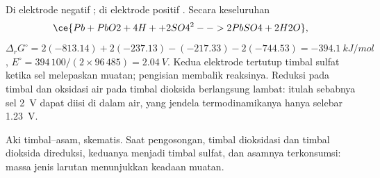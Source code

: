 \begin{example}\label{ex:b2:batteries-electrolysis:lead}
Di elektrode negatif ; di elektrode positif
. Secara keseluruhan
\[
  \ce{Pb + PbO2 + 4H+ + 2SO4^2- -> 2PbSO4 + 2H2O},
\]
$\Delta_r G^\circ = 2(-813.14) + 2(-237.13) - (-217.33) - 2(-744.53) =
\qty{-394.1}{kJ/mol}$, $E^\circ = 394\,100/(2 \times 96\,485) = \qty{2.04}{V}$.
Kedua elektrode tertutup timbal sulfat ketika sel melepaskan muatan;
pengisian membalik reaksinya. Reduksi  pada timbal dan oksidasi air
pada timbal dioksida berlangsung lambat: itulah sebabnya sel \qty{2}{V}
dapat diisi di dalam air, yang jendela termodinamikanya hanya selebar
\qty{1.23}{V}.
\end{example}

\begin{omfigure}

{\small Aki timbal--asam, skematis. Saat pengosongan, timbal dioksidasi dan
timbal dioksida direduksi, keduanya menjadi timbal sulfat, dan asamnya
terkonsumsi: massa jenis larutan menunjukkan keadaan muatan.}
\end{omfigure}

